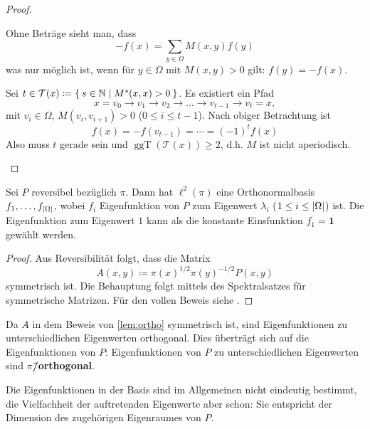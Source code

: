 \documentclass[ngerman,a4paper,11pt]{scrartcl}
\newcommand{\NN}{\mathbb{N}}
\DeclarePairedDelimiter{\abs}{\lvert}{\rvert}		%
\DeclareMathOperator{\ggT}{ggT}
\begin{document}
\begin{proof}
\begin{thmlist}
    Ohne Beträge sieht man, dass
    \begin{equation*}
     -f(x)=\sum_{y\in\Omega}M(x,y)f(y)
    \end{equation*}
   was nur möglich ist, wenn für $y\in\Omega$ mit $M(x,y)>0$ gilt: $f(y)=-f(x)$. 
   
   Sei $t\in\mathcal{T}(x)\coloneqq\Set{s\in\NN\mid M^s(x,x)>0}$. Es existiert
   ein Pfad
   \begin{equation*}
     x=v_0\rightarrow v_1\rightarrow v_2\rightarrow\dotso\rightarrow v_{t-1}\rightarrow v_t=x, 
   \end{equation*}
   mit $v_i\in\Omega$, $M(v_i, v_{i+1})>0$ ($0\leq i\leq t-1$). Nach obiger
   Betrachtung ist 
   \begin{equation*}
    f(x)=-f(v_{t-1})=\dotsb=(-1)^tf(x) 
   \end{equation*}
   Also muss $t$ gerade sein und $\ggT(\mathcal{T}(x))\geq 2$, d.h. $M$ ist
   nicht aperiodisch.
  \end{thmlist}
\end{proof}

\begin{lem}
 \label{lem:ortho}
 Sei $P$ reversibel bezüglich $\pi$. Dann hat $\ell^2(\pi)$  eine
 Orthonormalbasis $f_1,\dotsc ,f_{\abs{\Omega}}$, wobei $f_i$ Eigenfunktion von
 $P$ zum Eigenwert $\lambda_i$ ($1\leq i\leq\abs{\Omega}$) ist. Die
 Eigenfunktion zum Eigenwert $1$ kann als die konstante Einsfunktion $f_1=\mathbf{1}$ gewählt werden.
\end{lem}
\begin{proof}
 Aus Reversibilität folgt, dass die Matrix
 \begin{equation*}
  A(x,y)\coloneqq\pi(x)^{1/2}\pi(y)^{-1/2}P(x,y) 
 \end{equation*}
 symmetrisch ist. Die Behauptung folgt mittels des Spektralsatzes für
 symmetrische Matrizen. Für den vollen Beweis siehe \cite[Lemma~12.2(i)]{lpw}.
\end{proof}

\begin{rem}
 \label{rem:eigortho}
 \begin{remlist}
 \item Da $A$ in dem Beweis von \cref{lem:ortho} symmetrisch ist, sind Eigenfunktionen
  zu unterschiedlichen Eigenwerten orthogonal. Dies überträgt sich auf die
  Eigenfunktionen von $P$: Eigenfunktionen von $P$ zu unterschiedlichen
  Eigenwerten sind \textbf{$\pi$\=/orthogonal}.
 \item Die Eigenfunktionen in der Basis sind im Allgemeinen nicht eindeutig bestimmt, die
   Vielfachheit der auftretenden Eigenwerte aber schon: Sie entspricht der
   Dimension des zugehörigen Eigenraumes von $P$. \label{rem:eignum}
 \end{remlist}
\end{rem}
\end{document}
